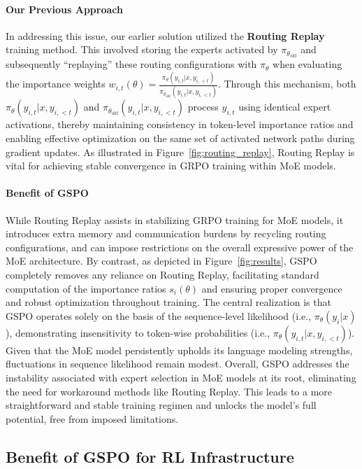 \paragraph{Our Previous Approach} In addressing this issue, our earlier solution utilized the \textbf{Routing Replay} training method. This involved storing the experts activated by $\pi_{\theta_\text{old}}$ and subsequently ``replaying'' these routing configurations with $\pi_{\theta}$ when evaluating the importance weights $w_{i,t}(\theta) = \frac{ \pi_{\theta} (y_{i,t} | x, y_{i,<t}) }{ \pi_{\theta_\text{old}} (y_{i,t} | x,y_{i,<t})}$. Through this mechanism, both $\pi_{\theta} (y_{i,t} | x, y_{i,<t})$ and $\pi_{\theta_\text{old}} (y_{i,t} | x,y_{i,<t})$ process $y_{i,t}$ using identical expert activations, thereby maintaining consistency in token-level importance ratios and enabling effective optimization on the same set of activated network paths during gradient updates. As illustrated in Figure~\ref{fig:routing_replay}, Routing Replay is vital for achieving stable convergence in GRPO training within MoE models.

\paragraph{Benefit of GSPO} While Routing Replay assists in stabilizing GRPO training for MoE models, it introduces extra memory and communication burdens by recycling routing configurations, and can impose restrictions on the overall expressive power of the MoE architecture. By contrast, as depicted in Figure~\ref{fig:results}, GSPO completely removes any reliance on Routing Replay, facilitating standard computation of the importance ratios $s_i(\theta)$ and ensuring proper convergence and robust optimization throughout training. The central realization is that GSPO operates solely on the basis of the sequence-level likelihood (i.e., $\pi_{\theta} (y_i | x)$), demonstrating insensitivity to token-wise probabilities (i.e., $\pi_{\theta} (y_{i,t} | x, y_{i,<t})$). Given that the MoE model persistently upholds its language modeling strengths, fluctuations in sequence likelihood remain modest. Overall, GSPO addresses the instability associated with expert selection in MoE models at its root, eliminating the need for workaround methods like Routing Replay. This leads to a more straightforward and stable training regimen and unlocks the model’s full potential, free from imposed limitations.

\subsection{Benefit of GSPO for RL Infrastructure}

